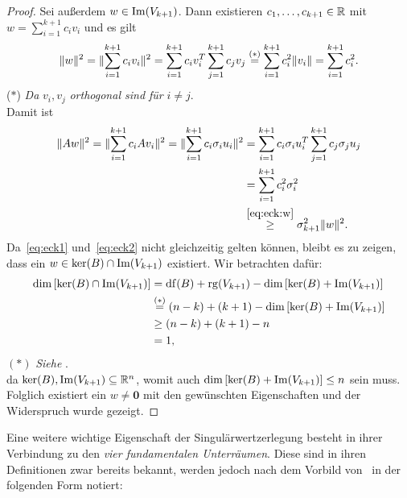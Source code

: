 \begin{proof}
    Sei außerdem \(w \in \operatorname{Im}(V_{k+1})\).
    Dann existieren \(c_{1},\ldots,c_{k+1} \in \mathbb{R}\) mit \(w = \sum_{i=1}^{k+1}c_{i}v_{i}\) und es gilt
    \begin{equation}\label{eq:eck:w}
        \lVert w\rVert^{2} = \lVert\sum_{i=1}^{k+1}c_{i}v_{i}\rVert^{2} = \sum_{i=1}^{k+1}c_{i}v_{i}^{T} \sum_{j=1}^{k+1}c_{j}v_{j} \overset{(*)}{=} \sum_{i=1}^{k+1}c_{i}^{2}\lVert v_{i}\rVert = \sum_{i=1}^{k+1}c_{i}^{2}.
    \end{equation}  
    {\small (\(*\)) \textit{Da} \(v_{i},v_{j}\) \textit{orthogonal sind für} \(i \neq j\).}
    \vspace{5pt}
    \\
    Damit ist
    \begin{align}
        \lVert Aw\rVert^{2} = \lVert\sum_{i=1}^{k+1}c_{i}Av_{i}\rVert^{2} = \lVert\sum_{i=1}^{k+1}c_{i}\sigma_{i}u_{i}\rVert^{2} &= \sum_{i=1}^{k+1}c_{i}\sigma_{i}u_{i}^{T} \sum_{j=1}^{k+1}c_{j}\sigma_{j}u_{j} \notag \\
        &= \sum_{i=1}^{k+1}c_{i}^{2}\sigma_{i}^{2} \notag \\
        &\overset{\eqref{eq:eck:w}}{\geq} \sigma_{k+1}^{2}\lVert w\rVert^{2} \label{eq:eck2}.
    \end{align}
    Da~\eqref{eq:eck1} und~\eqref{eq:eck2} nicht gleichzeitig gelten können, bleibt es zu zeigen, dass ein \(w \in \ker(B) \cap \operatorname{Im}(V_{k+1})\) existiert. 
    Wir betrachten dafür:
    \begin{align*}
        \dim\left[\ker(B) \cap \operatorname{Im}(V_{k+1})\right] &= \operatorname{df}(B) + \operatorname{rg}(V_{k+1}) - \dim\left[\ker(B) + \operatorname{Im}(V_{k+1})\right] \\
        &\overset{(*)}{=} (n-k) + (k + 1) - \dim\left[\ker(B) + \operatorname{Im}(V_{k+1})\right] \\
        &\geq (n-k) + (k + 1) -n \\
        &= 1,
    \end{align*}
    {\small \((*)\) \textit{Siehe }.}
    \vspace{5pt}
    \\
    da \(\ker(B),\operatorname{Im}(V_{k+1}) \subseteq \mathbb{R}^{n}\), womit auch \(\dim\left[\ker(B) + \operatorname{Im}(V_{k+1})\right] \leq n\) sein muss.  
    Folglich existiert ein \(w \neq \symbf{0}\) mit den gewünschten Eigenschaften und der Widerspruch wurde gezeigt.    
\end{proof}
Eine weitere wichtige Eigenschaft der Singulärwertzerlegung besteht in ihrer Verbindung zu den \emph{vier fundamentalen Unterräumen}.
Diese sind in ihren Definitionen zwar bereits bekannt, werden jedoch nach dem Vorbild von~\cite[187]{strangIntroductionLinearAlgebra2009} in der folgenden Form notiert:
